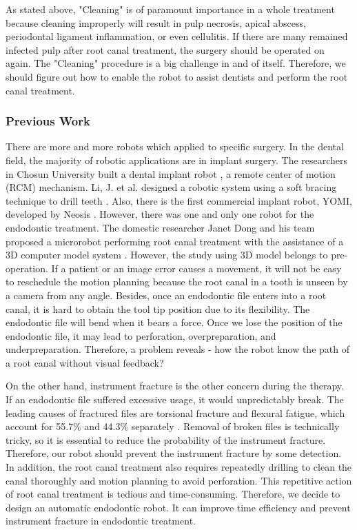 \par
As stated above, "Cleaning" is of paramount importance in a whole treatment because cleaning improperly will result in pulp necrosis, apical abscess, periodontal ligament inflammation, or even cellulitis. If there are many remained infected pulp after root canal treatment, the surgery should be operated on again. The "Cleaning" procedure is a big challenge in and of itself. Therefore, we should figure out how to enable the robot to assist dentists and perform the root canal treatment.
\subsubsection{Previous Work}
\hspace*{6mm}There are more and more robots which applied to specific surgery. In the dental field, the majority of robotic applications are in implant surgery. The researchers in Chosun University built a dental implant robot \cite{Kim2009ASO}, a remote center of motion (RCM) mechanism. Li, J. et al. designed a robotic system using a soft bracing technique to drill teeth \cite{Li2019ACD}. Also, there is the first commercial implant robot, YOMI, developed by Neosis \cite{web3}. However, there was one and only one robot for the endodontic treatment. The domestic researcher Janet Dong and his team proposed a microrobot performing root canal treatment with the assistance of a 3D computer model system \cite{dong2006wip}. However, the study using 3D model belongs to pre-operation. If a patient or an image error causes a movement, it will not be easy to reschedule the motion planning because the root canal in a tooth is unseen by a camera from any angle. Besides, once an endodontic file enters into a root canal, it is hard to obtain the tool tip position due to its flexibility. The endodontic file will bend when it bears a force. Once we lose the position of the endodontic file, it may lead to perforation, overpreparation, and underpreparation. Therefore, a problem reveals - how the robot know the path of a root canal without visual feedback? 
\par
On the other hand, instrument fracture is the other concern during the therapy. If an endodontic file suffered excessive usage, it would unpredictably break. The leading causes of fractured files are torsional fracture and flexural fatigue, which account for 55.7\% and 44.3\% separately \cite{SATTAPAN2000161}. Removal of broken files is technically tricky, so it is essential to reduce the probability of the instrument fracture. Therefore, our robot should prevent the instrument fracture by some detection. In addition, the root canal treatment also requires repeatedly drilling to clean the canal thoroughly and motion planning to avoid perforation. This repetitive action of root canal treatment is tedious and time-consuming. Therefore, we decide to design an automatic endodontic robot. It can improve time efficiency and prevent instrument fracture in endodontic treatment.	
\par
